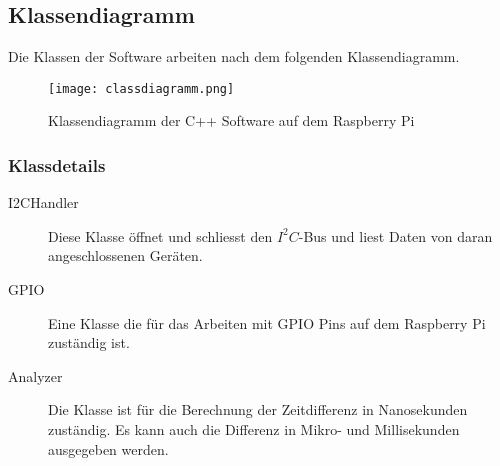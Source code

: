 \subsection{Klassendiagramm}
Die Klassen der Software arbeiten nach dem folgenden Klassendiagramm.
\begin{figure}[H]
    \centering
    \texttt{[image: classdiagramm.png]}
    \caption{Klassendiagramm der C++ Software auf dem Raspberry Pi}
\end{figure}
\subsubsection{Klassdetails}
	\begin{description}
        \item[I2CHandler] Diese Klasse öffnet und schliesst den $I^2C$-Bus und liest Daten von daran angeschlossenen Geräten.
        \item[GPIO] Eine Klasse die für das Arbeiten mit GPIO Pins auf dem Raspberry Pi zuständig ist.
        \item[Analyzer] Die Klasse ist für die Berechnung der Zeitdifferenz in Nanosekunden zuständig. Es kann auch die Differenz in Mikro- und Millisekunden ausgegeben werden.
    \end{description}